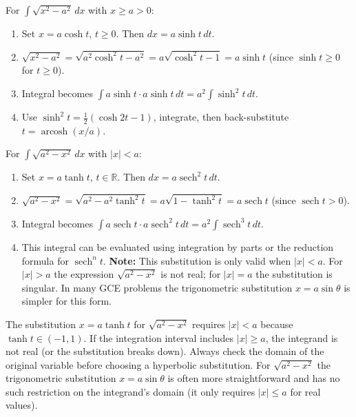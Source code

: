 \documentclass[11pt]{article}
\begin{document}
\begin{methode}[Substitution $x = a\cosh t$ for $\sqrt{x^2 - a^2}$]
For $\displaystyle \int \sqrt{x^2 - a^2}\,dx$ with $x \ge a > 0$:
\begin{enumerate}
\item Set $x = a\cosh t$, $t \ge 0$. Then $dx = a\sinh t\,dt$.
\item $\sqrt{x^2 - a^2} = \sqrt{a^2\cosh^2 t - a^2} = a\sqrt{\cosh^2 t - 1} = a\sinh t$ (since $\sinh t \ge 0$ for $t \ge 0$).
\item Integral becomes $\displaystyle \int a\sinh t \cdot a\sinh t\,dt = a^2\int \sinh^2 t\,dt$.
\item Use $\sinh^2 t = \frac{1}{2}(\cosh 2t - 1)$, integrate, then back-substitute $t = \operatorname{arcosh}(x/a)$.
\end{enumerate}
\end{methode}

\begin{methode}[Substitution $x = a\tanh t$ for $\sqrt{a^2 - x^2}$]
For $\displaystyle \int \sqrt{a^2 - x^2}\,dx$ with $|x| < a$:
\begin{enumerate}
\item Set $x = a\tanh t$, $t \in \mathbb{R}$. Then $dx = a\operatorname{sech}^2 t\,dt$.
\item $\sqrt{a^2 - x^2} = \sqrt{a^2 - a^2\tanh^2 t} = a\sqrt{1 - \tanh^2 t} = a\operatorname{sech} t$ (since $\operatorname{sech} t > 0$).
\item Integral becomes $\displaystyle \int a\operatorname{sech} t \cdot a\operatorname{sech}^2 t\,dt = a^2\int \operatorname{sech}^3 t\,dt$.
\item This integral can be evaluated using integration by parts or the reduction formula for $\operatorname{sech}^n t$. \textbf{Note:} This substitution is only valid when $|x| < a$. For $|x| > a$ the expression $\sqrt{a^2 - x^2}$ is not real; for $|x| = a$ the substitution is singular. In many GCE problems the trigonometric substitution $x = a\sin\theta$ is simpler for this form.
\end{enumerate}
\end{methode}

\begin{attention}
The substitution $x = a\tanh t$ for $\sqrt{a^2 - x^2}$ requires $|x| < a$ because $\tanh t \in (-1,1)$. If the integration interval includes $|x| \ge a$, the integrand is not real (or the substitution breaks down). Always check the domain of the original variable before choosing a hyperbolic substitution. For $\sqrt{a^2 - x^2}$ the trigonometric substitution $x = a\sin\theta$ is often more straightforward and has no such restriction on the integrand's domain (it only requires $|x| \le a$ for real values).
\end{attention}
\end{document}
